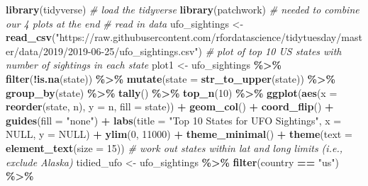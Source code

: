 \documentclass[
]{book}
\newenvironment{Shaded}{\begin{snugshade}}{\end{snugshade}}
\newcommand{\AttributeTok}[1]{\textcolor[rgb]{0.13,0.29,0.53}{#1}}
\newcommand{\CommentTok}[1]{\textcolor[rgb]{0.56,0.35,0.01}{\textit{#1}}}
\newcommand{\ConstantTok}[1]{\textcolor[rgb]{0.56,0.35,0.01}{#1}}
\newcommand{\DecValTok}[1]{\textcolor[rgb]{0.00,0.00,0.81}{#1}}
\newcommand{\FunctionTok}[1]{\textcolor[rgb]{0.13,0.29,0.53}{\textbf{#1}}}
\newcommand{\NormalTok}[1]{#1}
\newcommand{\OtherTok}[1]{\textcolor[rgb]{0.56,0.35,0.01}{#1}}
\newcommand{\SpecialCharTok}[1]{\textcolor[rgb]{0.81,0.36,0.00}{\textbf{#1}}}
\newcommand{\StringTok}[1]{\textcolor[rgb]{0.31,0.60,0.02}{#1}}
\begin{document}
\begin{Shaded}
\begin{Highlighting}[]
\FunctionTok{library}\NormalTok{(tidyverse) }\CommentTok{\# load the tidyverse}
\FunctionTok{library}\NormalTok{(patchwork) }\CommentTok{\# needed to combine our 4 plots at the end}
\CommentTok{\# read in data }
\NormalTok{ufo\_sightings }\OtherTok{\textless{}{-}} \FunctionTok{read\_csv}\NormalTok{(}\StringTok{"https://raw.githubusercontent.com/rfordatascience/tidytuesday/master/data/2019/2019{-}06{-}25/ufo\_sightings.csv"}\NormalTok{)}
\CommentTok{\# plot of top 10 US states with number of sightings in each state}
\NormalTok{plot1 }\OtherTok{\textless{}{-}}\NormalTok{ ufo\_sightings }\SpecialCharTok{\%\textgreater{}\%}
  \FunctionTok{filter}\NormalTok{(}\SpecialCharTok{!}\FunctionTok{is.na}\NormalTok{(state)) }\SpecialCharTok{\%\textgreater{}\%}
  \FunctionTok{mutate}\NormalTok{(}\AttributeTok{state =} \FunctionTok{str\_to\_upper}\NormalTok{(state)) }\SpecialCharTok{\%\textgreater{}\%}
  \FunctionTok{group\_by}\NormalTok{(state) }\SpecialCharTok{\%\textgreater{}\%}
  \FunctionTok{tally}\NormalTok{() }\SpecialCharTok{\%\textgreater{}\%}
  \FunctionTok{top\_n}\NormalTok{(}\DecValTok{10}\NormalTok{) }\SpecialCharTok{\%\textgreater{}\%}
  \FunctionTok{ggplot}\NormalTok{(}\FunctionTok{aes}\NormalTok{(}\AttributeTok{x =} \FunctionTok{reorder}\NormalTok{(state, n), }\AttributeTok{y =}\NormalTok{ n, }\AttributeTok{fill =}\NormalTok{ state)) }\SpecialCharTok{+}
  \FunctionTok{geom\_col}\NormalTok{() }\SpecialCharTok{+} 
  \FunctionTok{coord\_flip}\NormalTok{() }\SpecialCharTok{+}
  \FunctionTok{guides}\NormalTok{(}\AttributeTok{fill =} \StringTok{"none"}\NormalTok{) }\SpecialCharTok{+} 
  \FunctionTok{labs}\NormalTok{(}\AttributeTok{title =} \StringTok{"Top 10 States for UFO Sightings"}\NormalTok{,}
       \AttributeTok{x =} \ConstantTok{NULL}\NormalTok{, }
       \AttributeTok{y =} \ConstantTok{NULL}\NormalTok{) }\SpecialCharTok{+}
  \FunctionTok{ylim}\NormalTok{(}\DecValTok{0}\NormalTok{, }\DecValTok{11000}\NormalTok{) }\SpecialCharTok{+}
  \FunctionTok{theme\_minimal}\NormalTok{() }\SpecialCharTok{+}
  \FunctionTok{theme}\NormalTok{(}\AttributeTok{text =} \FunctionTok{element\_text}\NormalTok{(}\AttributeTok{size =} \DecValTok{15}\NormalTok{))}
\CommentTok{\# work out states within lat and long limits (i.e., exclude Alaska)}
\NormalTok{tidied\_ufo }\OtherTok{\textless{}{-}}\NormalTok{ ufo\_sightings }\SpecialCharTok{\%\textgreater{}\%}
  \FunctionTok{filter}\NormalTok{(country }\SpecialCharTok{==} \StringTok{"us"}\NormalTok{) }\SpecialCharTok{\%\textgreater{}\%}

\end{Highlighting}
\end{Shaded}
\end{document}
